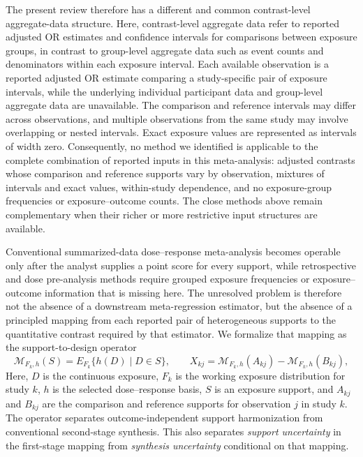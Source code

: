 \documentclass[journal=rsm]{CUP-JNL-DTM}%
\theoremstyle{definition}
\numberwithin{equation}{section}
\begin{document}
The present review therefore has a different and common contrast-level
aggregate-data structure. Here, contrast-level aggregate data refer to
reported adjusted OR estimates and confidence intervals for comparisons between
exposure groups, in contrast to group-level aggregate data such as event
counts and denominators within each exposure interval. Each available observation is a reported adjusted OR estimate comparing a
study-specific pair of exposure intervals, while the underlying individual participant data and group-level aggregate data are unavailable. The comparison and reference
intervals may differ across observations, and multiple observations from the
same study may involve overlapping or nested intervals. Exact exposure values
are represented as intervals of width zero. Consequently, no method we identified is applicable to
the complete combination of reported inputs in this meta-analysis: adjusted
contrasts whose comparison and reference supports vary by observation,
mixtures of intervals and exact values, within-study dependence, and no
exposure-group frequencies or exposure--outcome counts. The close methods
above remain complementary when their richer or more restrictive input
structures are available.

Conventional summarized-data dose--response meta-analysis becomes operable
only after the analyst supplies a point score for every support, while
retrospective and dose pre-analysis methods require grouped exposure
frequencies or exposure--outcome information that is missing here.
The unresolved problem is therefore not the absence of a downstream
meta-regression estimator, but the absence of a principled mapping from each
reported pair of heterogeneous supports to the quantitative contrast required
by that estimator. We formalize that mapping as the support-to-design operator
\begin{equation}
 \mathcal M_{F_k,h}(S)=E_{F_k}\{h(D)\mid D\in S\},
 \qquad
 X_{kj}=\mathcal M_{F_k,h}(A_{kj})-
         \mathcal M_{F_k,h}(B_{kj}),
 \label{eq:support_operator_intro}
\end{equation}
Here, $D$ is the continuous exposure, $F_k$ is the working exposure
distribution for study $k$, $h$ is the selected dose--response basis, $S$ is
an exposure support, and $A_{kj}$ and $B_{kj}$ are the comparison and reference
supports for observation $j$ in study $k$.
The operator separates outcome-independent support harmonization from conventional
second-stage synthesis. This also separates \emph{support uncertainty} in the
first-stage mapping from \emph{synthesis uncertainty} conditional on that
mapping.
\end{document}
